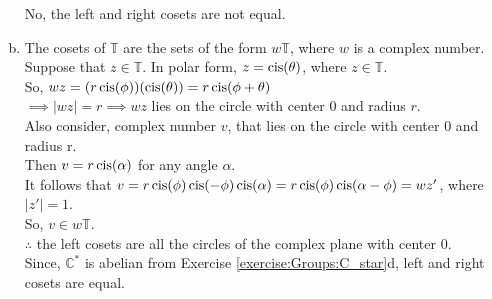 \begin{enumerate}[(a)]
No, the left and right cosets are not equal.
\\

\item
The cosets of ${\mathbb T}$ are the sets of the form $w{\mathbb T}$, where $w$ is a complex number.
\\
Suppose that $z \in {\mathbb T}$.  In polar form, $z = \operatorname{cis} (\theta)$, where $z \in {\mathbb T}$.
\\
So, $wz =( r \operatorname{cis} (\phi))(\operatorname{cis} (\theta)) = r \operatorname{cis} (\phi + \theta)$
\\
$\implies |wz| = r \implies wz$ lies on the circle with center 0 and radius $r$.
\\
Also consider, complex number $v$, that lies on the circle with center 0 and radius r. 
\\
Then $v = r \operatorname{cis}(\alpha)$ for any angle $\alpha$.
\\
It follows that $v = r \operatorname{cis}(\phi) \operatorname{cis}(-\phi) \operatorname{cis}(\alpha) = r \operatorname{cis}(\phi) \operatorname{cis}(\alpha - \phi) = wz'$, where $|z'| = 1$.
\\
So, $v \in w{\mathbb T}$.
\\
$\therefore$ the left cosets are all the circles of the complex plane with center 0.
\\
Since, ${\mathbb C}^\ast$ is abelian from Exercise \ref{exercise:Groups:C_star}d, left and right cosets are equal.
\end{enumerate}


